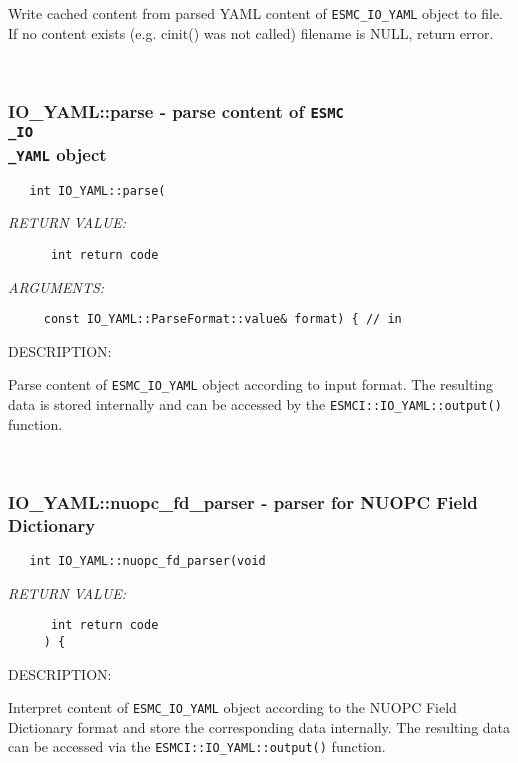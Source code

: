         Write cached content from parsed YAML content of {\tt ESMC\_IO\_YAML}
        object to file. If no content exists (e.g. cinit() was not called)
        filename is NULL, return error.
   
 
\mbox{}\hrulefill\
 
\subsubsection [IO\_YAML::parse] {IO\_YAML::parse - parse content of {\tt ESMC\\_IO\\_YAML} object}


  
\begin{verbatim}   int IO_YAML::parse(\end{verbatim}{\em RETURN VALUE:}
\begin{verbatim}      int return code\end{verbatim}{\em ARGUMENTS:}
\begin{verbatim}     const IO_YAML::ParseFormat::value& format) { // in
 \end{verbatim}
{\sf DESCRIPTION:\\ }


        Parse content of {\tt ESMC\_IO\_YAML} object according to input format.
        The resulting data is stored internally and can be accessed by the
        {\tt ESMCI::IO\_YAML::output()} function.
   
 
\mbox{}\hrulefill\
 
\subsubsection [IO\_YAML::nuopc\_fd\_parser] {IO\_YAML::nuopc\_fd\_parser - parser for NUOPC Field Dictionary}


  
\begin{verbatim}   int IO_YAML::nuopc_fd_parser(void\end{verbatim}{\em RETURN VALUE:}
\begin{verbatim}      int return code
     ) {\end{verbatim}
{\sf DESCRIPTION:\\ }


        Interpret content of {\tt ESMC\_IO\_YAML} object according to the
        NUOPC Field Dictionary format and store the corresponding data
        internally. The resulting data can be accessed via the
        {\tt ESMCI::IO\_YAML::output()} function.
  
\setlength{\parskip}{\oldparskip}
\setlength{\parindent}{\oldparindent}
\setlength{\baselineskip}{\oldbaselineskip}

